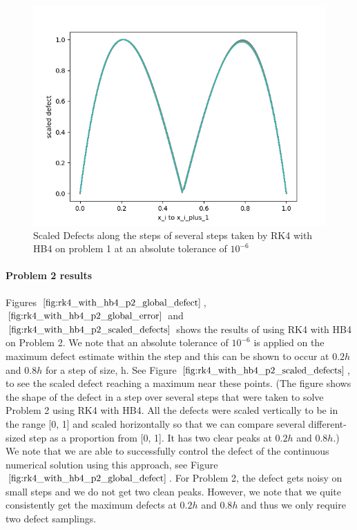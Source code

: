 \documentclass{article}
\begin{document}
\begin{figure}[H]
\centering
\includegraphics[width=0.7\linewidth]{./figures/rk4_with_hb4_p1_scaled_defects}
\caption{Scaled Defects along the steps of several steps taken by RK4 with HB4 on problem 1 at an absolute tolerance of $10^{-6}$}
\label{fig:rk4_with_hb4_p1_scaled_defects}
\end{figure}

\paragraph{Problem 2 results}
Figures $\ref{fig:rk4_with_hb4_p2_global_defect}$, $\ref{fig:rk4_with_hb4_p2_global_error}$ and $\ref{fig:rk4_with_hb4_p2_scaled_defects}$ shows the results of using RK4 with HB4 on Problem 2. We note that an absolute tolerance of $10^{-6}$ is applied on the maximum defect estimate within the step and this can be shown to occur at $0.2h$ and $0.8h$ for a step of size, h. See Figure $\ref{fig:rk4_with_hb4_p2_scaled_defects}$, to see the scaled defect reaching a maximum near these points. (The figure shows the shape of the defect in a step over several steps that were taken to solve Problem 2 using RK4 with HB4. All the defects were scaled vertically to be in the range [0, 1] and scaled horizontally so that we can compare several different-sized step as a proportion from [0, 1]. It has two clear peaks at $0.2h$ and $0.8h$.) We note that we are able to successfully control the defect of the continuous numerical solution using this approach, see Figure $\ref{fig:rk4_with_hb4_p2_global_defect}$. For Problem 2, the defect gets noisy on small steps and we do not get two clean peaks. However, we note that we quite consistently get the maximum defects at $0.2h$ and $0.8h$ and thus we only require two defect samplings.
\end{document}
